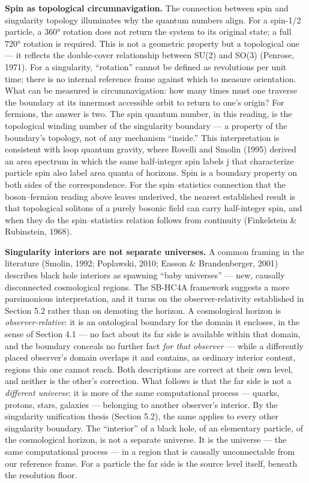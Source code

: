 \documentclass[
]{article}
\begin{document}
\textbf{Spin as topological circumnavigation.} The connection between
spin and singularity topology illuminates why the quantum numbers align.
For a spin-1/2 particle, a 360° rotation does not return the system to
its original state; a full 720° rotation is required. This is not a
geometric property but a topological one --- it reflects the
double-cover relationship between SU(2) and SO(3) (Penrose, 1971). For a
singularity, ``rotation'' cannot be defined as revolutions per unit
time; there is no internal reference frame against which to measure
orientation. What can be measured is circumnavigation: how many times
must one traverse the boundary at its innermost accessible orbit to
return to one's origin? For fermions, the answer is two. The spin
quantum number, in this reading, is the topological winding number of
the singularity boundary --- a property of the boundary's topology, not
of any mechanism ``inside.'' This interpretation is consistent with loop
quantum gravity, where Rovelli and Smolin (1995) derived an area
spectrum in which the same half-integer spin labels j that characterize
particle spin also label area quanta of horizons. Spin is a boundary
property on both sides of the correspondence. For the spin--statistics
connection that the boson--fermion reading above leaves underived, the
nearest established result is that topological solitons of a purely
bosonic field can carry half-integer spin, and when they do the
spin--statistics relation follows from continuity (Finkelstein \&
Rubinstein, 1968).

\textbf{Singularity interiors are not separate universes.} A common
framing in the literature (Smolin, 1992; Poplawski, 2010; Easson \&
Brandenberger, 2001) describes black hole interiors as spawning ``baby
universes'' --- new, causally disconnected cosmological regions. The
SB-HC4A framework suggests a more parsimonious interpretation, and it
turns on the observer-relativity established in Section 5.2 rather than
on demoting the horizon. A cosmological horizon is
\emph{observer-relative}: it is an ontological boundary for the domain
it encloses, in the sense of Section 4.1 --- no fact about its far side
is available within that domain, and the boundary conceals no further
fact \emph{for that observer} --- while a differently placed observer's
domain overlaps it and contains, as ordinary interior content, regions
this one cannot reach. Both descriptions are correct at their own level,
and neither is the other's correction. What follows is that the far side
is not a \emph{different universe}: it is more of the same computational
process --- quarks, protons, stars, galaxies --- belonging to another
observer's interior. By the singularity unification thesis (Section
5.2), the same applies to every other singularity boundary. The
``interior'' of a black hole, of an elementary particle, of the
cosmological horizon, is not a separate universe. It is the universe ---
the same computational process --- in a region that is causally
unconnectable from our reference frame. For a particle the far side is
the source level itself, beneath the resolution floor.
\end{document}

